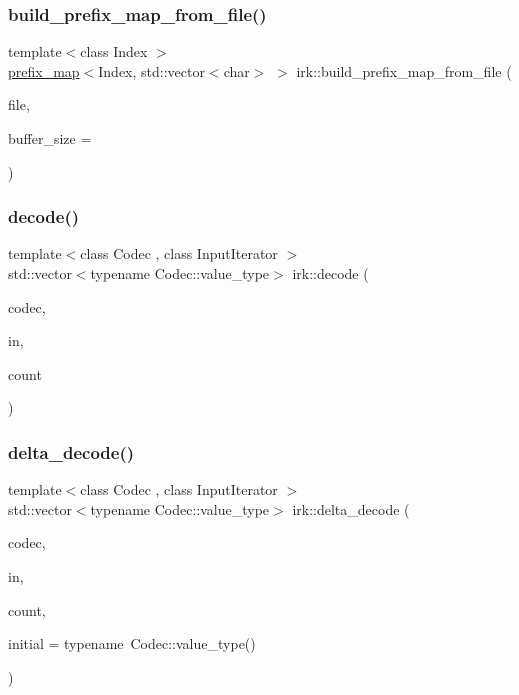 \subsubsection{\texorpdfstring{build\+\_\+prefix\+\_\+map\+\_\+from\+\_\+file()}{build\_prefix\_map\_from\_file()}}
{\footnotesize\ttfamily template$<$class Index $>$ \\
\mbox{\hyperlink{classirk_1_1prefix__map}{prefix\+\_\+map}}$<$Index, std\+::vector$<$char$>$ $>$ irk\+::build\+\_\+prefix\+\_\+map\+\_\+from\+\_\+file (\begin{DoxyParamCaption}\item[{fs\+::path}]{file,  }\item[{std\+::size\+\_\+t}]{buffer\+\_\+size = {} }\end{DoxyParamCaption})}

\mbox{\label{namespaceirk_ac678e4f1c19b59023c14a6deb7fe801e}} 
\subsubsection{\texorpdfstring{decode()}{decode()}}
{\footnotesize\ttfamily template$<$class Codec , class Input\+Iterator $>$ \\
std\+::vector$<$typename Codec\+::value\+\_\+type$>$ irk\+::decode (\begin{DoxyParamCaption}\item[{const Codec \&}]{codec,  }\item[{Input\+Iterator}]{in,  }\item[{int}]{count }\end{DoxyParamCaption})}

\mbox{\label{namespaceirk_aed126d81c1570fca4222c3d51a8f4ba2}} 
\subsubsection{\texorpdfstring{delta\+\_\+decode()}{delta\_decode()}}
{\footnotesize\ttfamily template$<$class Codec , class Input\+Iterator $>$ \\
std\+::vector$<$typename Codec\+::value\+\_\+type$>$ irk\+::delta\+\_\+decode (\begin{DoxyParamCaption}\item[{const Codec \&}]{codec,  }\item[{Input\+Iterator}]{in,  }\item[{int}]{count,  }\item[{typename Codec\+::value\+\_\+type}]{initial = {\ttfamily typename~Codec\+:\+:value\+\_\+type()} }\end{DoxyParamCaption})}

